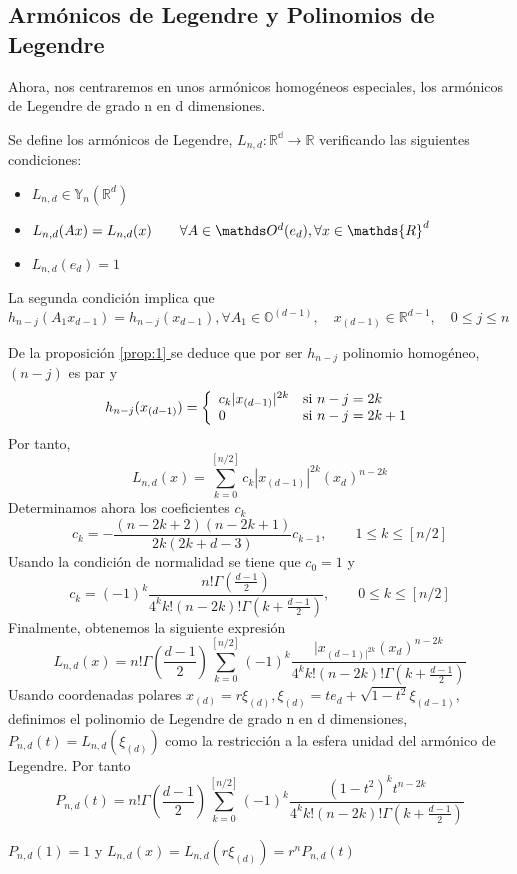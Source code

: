\subsection{Armónicos de Legendre y Polinomios de Legendre}
Ahora, nos centraremos en unos armónicos homogéneos especiales, los armónicos de Legendre de grado n en d dimensiones.
\begin{defn}
	Se define los armónicos de Legendre, $L_{n,d}:\mathds{R^d}\to\mathds{R}$ verificando las siguientes condiciones:
	\begin{itemize}
		\item $L_{n,d} \in \mathds{Y}_n(\mathds{R}^d)$ 
		\item $L_{n,d}(Ax) = L_{n,d}(x) \qquad  \forall A \in \orto(e_d), \forall x \in \mathds{R}^d$ 
		\item $L_{n,d}(e_d) = 1$
	\end{itemize}
\end{defn}
\begin{rem}
La segunda condición implica que $h_{n-j}(A_1x_{d-1})=h_{n-j}(x_{d-1}), \forall A_1\in \mathds{O}^{(d-1)},\quad x_{(d-1)}\in\mathds{R}^{d-1}, \quad 0\le j\le n$
\end{rem}
De la proposición \hyperref[]{\ref*{prop:1} }
se deduce que por ser $h_{n-j}$ polinomio homogéneo,$(n-j)$ es par y 
\begin{equation}
h_{n-j}(x_{(d-1)}) = \left\lbrace
\begin{array}{ll}
c_k|x_{(d-1)}|^{2k} & \textup{si } n-j=2k \\
0 & \textup{si } n-j=2k+1
\end{array}
\right.
\end{equation}
Por tanto,
$$
L_{n,d}(x) = \sum_{k=0}^{[n/2]} c_k|x_{(d-1)}|^{2k}(x_d)^{n-2k}
$$
Determinamos ahora los coeficientes $c_k$
$$
c_k = - \frac{(n-2k+2)(n-2k+1)}{2k(2k+d-3)}c_{k-1}, \qquad 1\le k \le [n/2]
$$
Usando la condición de normalidad se tiene que $c_0 = 1$ y $$
c_k = (-1)^k \frac{n!\Gamma(\frac{d-1}{2})}{4^kk!(n-2k)!\Gamma(k+\frac{d-1}{2})}, \qquad 0\le k \le [n/2]
$$
Finalmente, obtenemos la siguiente expresión 
$$
L_{n,d}(x) = n!\Gamma(\frac{d-1}{2})\sum_{k=0}^{[n/2]}(-1)^k\frac{|x_{(d-1)|^{2k}}(x_d)^{n-2k}}{4^kk!(n-2k)!\Gamma(k+\frac{d-1}{2})}
$$
Usando coordenadas polares $x_{(d)}=r\xi_{(d)},\xi_{(d)} = te_d+\sqrt{1-t^2}\xi_{(d-1)}$, definimos el polinomio de Legendre de grado n en d dimensiones, $P_{n,d}(t) = L_{n,d}(\xi_{(d)})$ como la restricción a la esfera unidad del armónico de Legendre. Por tanto $$
P_{n,d}(t)=n!\Gamma(\frac{d-1}{2})\sum_{k=0}^{[n/2]}(-1)^k\frac{(1-t^2)^{k}t^{n-2k}}{4^kk!(n-2k)!\Gamma(k+\frac{d-1}{2})}
$$
\begin{rem}
$P_{n,d}(1)=1$ y $L_{n,d}(x) = L_{n,d}(r\xi_{(d)}) = r^nP_{n,d}(t)$
\end{rem}
